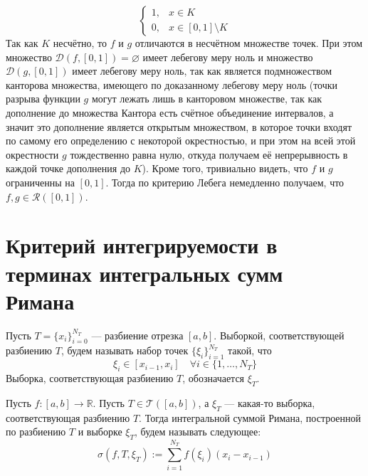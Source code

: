 \documentclass[11pt]{article}
\begin{document}
\begin{example}
\begin{equation*}
        \begin{cases}
            1, & x \in K \\
            0, & x \in [0, 1] \setminus K
        \end{cases}
    \end{equation*}
    Так как $K$ несчётно, то $f$ и $g$ отличаются в несчётном множестве точек. При этом множество $\mathcal{D}(f, [0, 1]) = \varnothing$ имеет лебегову меру ноль и множество $\mathcal{D}(g, [0, 1])$ имеет лебегову меру ноль, так как является подмножеством канторова множества, имеющего по доказанному лебегову меру ноль (точки разрыва функции $g$ могут лежать лишь в канторовом множестве, так как дополнение до множества Кантора есть счётное объединение интервалов, а значит это дополнение является открытым множеством, в которое точки входят по самому его определению с некоторой окрестностью, и при этом на всей этой окрестности $g$ тождественно равна нулю, откуда получаем её непрерывность в каждой точке дополнения до $K$). Кроме того, тривиально видеть, что $f$ и $g$ ограниченны на $[0, 1]$. Тогда по критерию Лебега немедленно получаем, что $f, g \in \mathcal{R}([0, 1])$.
\end{example}

\section{Критерий интегрируемости в терминах интегральных сумм \\ Римана}

\begin{definition}
    Пусть $T = \{x_i\}_{i = 0}^{N_T}$ --- разбиение отрезка $[a, b]$. Выборкой, соответствующей разбиению $T$, будем называть набор точек $\{\xi_i\}_{i = 1}^{N_T}$ такой, что 
    \[\xi_i \in [x_{i - 1}, x_i] \quad \forall i \in \{1, \ldots, N_T\}\]
    Выборка, соответствующая разбиению $T$, обозначается $\xi_T$.
\end{definition}

\begin{definition}
    Пусть $f \colon [a, b] \to \mathbb{R}$. Пусть $T \in \mathcal{T}([a, b])$, а $\xi_T$ --- какая-то выборка, соответствующая разбиению $T$. Тогда интегральной суммой Римана, построенной по разбиению $T$ и выборке $\xi_T$, будем называть следующее:
    \[\sigma(f, T, \xi_T) := \sum_{i = 1}^{N_T} f(\xi_i) (x_i - x_{i - 1})\]
\end{definition}
\end{document}

